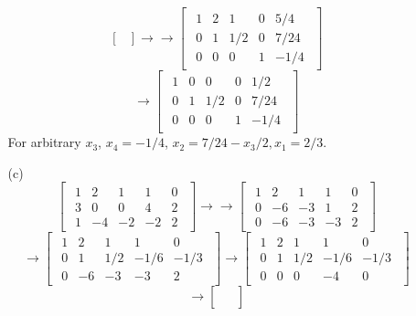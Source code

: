 \begin{itemize}
\begin{itemize}
$$\begin{bmatrix}
\end{bmatrix}\rightarrow\rightarrow \begin{bmatrix}
\begin{array}{cccc|c}
1 & 2 & 1 & 0 & 5/4 \\
0 & 1 & 1/2 & 0 & 7/24 \\
0 & 0 & 0 & 1 & -1/4
\end{array}
\end{bmatrix}$$
$$\rightarrow \begin{bmatrix}
\begin{array}{cccc|c}
1 & 0 & 0 & 0 & 1/2 \\
0 & 1 & 1/2 & 0 & 7/24 \\
0 & 0 & 0 & 1 & -1/4
\end{array}
\end{bmatrix}$$
For arbitrary $x_3$, $x_4 = -1/4$, $x_2 = 7/24 - x_3/2, x_1 = 2/3$.
\item[(c)]
$$\begin{bmatrix}
\begin{array}{cccc|c}
1 & 2 & 1 & 1 & 0 \\
3 & 0 & 0 & 4 & 2 \\
1 & -4 & -2 & -2 & 2
\end{array}
\end{bmatrix} \rightarrow\rightarrow \begin{bmatrix}
\begin{array}{cccc|c}
1 & 2 & 1 & 1 & 0 \\
0 & -6 & -3 & 1 & 2 \\
0 & -6 & -3 & -3 & 2
\end{array}
\end{bmatrix}$$
$$ \rightarrow \begin{bmatrix}
\begin{array}{cccc|c}
1 & 2 & 1 & 1 & 0 \\
0 & 1 & 1/2 & -1/6 & -1/3 \\
0 & -6 & -3 & -3 & 2
\end{array}
\end{bmatrix} \rightarrow \begin{bmatrix}
\begin{array}{cccc|c}
1 & 2 & 1 & 1 & 0 \\
0 & 1 & 1/2 & -1/6 & -1/3 \\
0 & 0 & 0 & -4 & 0
\end{array}
\end{bmatrix}$$
$$\rightarrow \begin{bmatrix}
\begin{array}{cccc|c}

\end{array}
\end{bmatrix}$$
\end{itemize}
\end{itemize}

